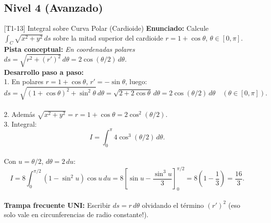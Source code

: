 \documentclass[11pt,a4paper]{article}
\begin{document}
\subsection{Nivel 4 (Avanzado)}

\begin{ejerciciobox}{[T1-13] Integral sobre Curva Polar (Cardioide)}
\textbf{Enunciado:} Calcule $\int_C \sqrt{x^2+y^2}\,ds$ sobre la mitad superior del cardioide $r = 1 + \cos\theta$, $\theta \in [0, \pi]$.\\[0.2cm]
\textbf{Pista conceptual:} \emph{En coordenadas polares $ds = \sqrt{r^2 + (r')^2}\,d\theta = 2\cos(\theta/2)\,d\theta$.}\\[0.2cm]
\textbf{Desarrollo paso a paso:}\\
1. En polares $r = 1+\cos\theta$, $r' = -\sin\theta$, luego:\\
$$ds = \sqrt{(1+\cos\theta)^2 + \sin^2\theta}\,d\theta = \sqrt{2 + 2\cos\theta}\,d\theta = 2\cos(\theta/2)\,d\theta \quad (\theta \in [0,\pi]).$$\\
2. Además $\sqrt{x^2+y^2} = r = 1+\cos\theta = 2\cos^2(\theta/2)$.\\
3. Integral:\\
$$I = \int_0^\pi 4\cos^3(\theta/2)\,d\theta.$$\\
Con $u = \theta/2$, $d\theta = 2\,du$:\\
$$I = 8\int_0^{\pi/2} (1 - \sin^2 u)\cos u\,du = 8\left[\sin u - \frac{\sin^3 u}{3}\right]_0^{\pi/2} = 8\left(1 - \frac{1}{3}\right) = \frac{16}{3}.$$\\[0.2cm]
\textbf{Trampa frecuente UNI:} Escribir $ds = r\,d\theta$ olvidando el término $(r')^2$ (eso solo vale en circunferencias de radio constante!).
\end{ejerciciobox}
\end{document}
